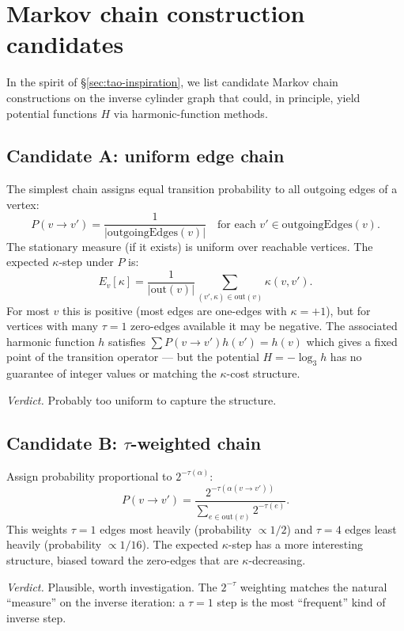 \documentclass[11pt,a4paper]{article}
\theoremstyle{plain}
\theoremstyle{definition}
\begin{document}
\section{Markov chain construction candidates}\label{app:markov-chains}

In the spirit of \S\ref{sec:tao-inspiration}, we list candidate
Markov chain constructions on the inverse cylinder graph that
could, in principle, yield potential functions $H$ via
harmonic-function methods.

\subsection{Candidate A: uniform edge chain}

The simplest chain assigns equal transition probability to all
outgoing edges of a vertex:
\[
   P(v \to v') = \frac{1}{|\mathrm{outgoingEdges}(v)|}
   \quad \text{for each } v' \in \mathrm{outgoingEdges}(v).
\]
The stationary measure (if it exists) is uniform over reachable
vertices. The expected $\kappa$-step under $P$ is:
\[
   E_{v}[\kappa] = \frac{1}{|\mathrm{out}(v)|}
                  \sum_{(v', \kappa) \in \mathrm{out}(v)} \kappa(v, v').
\]
For most $v$ this is positive (most edges are one-edges with
$\kappa = +1$), but for vertices with many $\tau = 1$ zero-edges
available it may be negative. The associated harmonic function
$h$ satisfies $\sum P(v \to v') h(v') = h(v)$ which gives a fixed
point of the transition operator — but the potential
$H = -\log_3 h$ has no guarantee of integer values or matching the
$\kappa$-cost structure.

\emph{Verdict.} Probably too uniform to capture the structure.

\subsection{Candidate B: $\tau$-weighted chain}

Assign probability proportional to $2^{-\tau(\alpha)}$:
\[
   P(v \to v') = \frac{2^{-\tau(\alpha(v \to v'))}}{\sum_{e \in \mathrm{out}(v)} 2^{-\tau(e)}}.
\]
This weights $\tau = 1$ edges most heavily (probability
$\propto 1/2$) and $\tau = 4$ edges least heavily (probability
$\propto 1/16$). The expected $\kappa$-step has a more interesting
structure, biased toward the zero-edges that are
$\kappa$-decreasing.

\emph{Verdict.} Plausible, worth investigation. The
$2^{-\tau}$ weighting matches the natural ``measure'' on the
inverse iteration: a $\tau = 1$ step is the most ``frequent'' kind
of inverse step.
\end{document}
